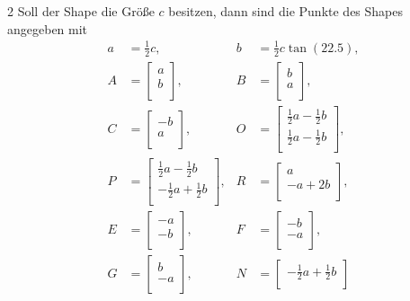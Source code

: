 \documentclass[twoside,fontsize=brochure]{tudcdreprt}
\begin{document}
\begin{multicols*}{2}
Soll der Shape die Größe $c$ besitzen, dann sind die Punkte des Shapes angegeben mit
\begin{align}
  a &= \frac{1}{2} c, & b &= \frac{1}{2} c \tan(\num{22.5}), \\
  A &= \begin{bmatrix}
    a \\
    b \\
  \end{bmatrix}, &
  B &= \begin{bmatrix}
    b \\
    a \\
  \end{bmatrix}, \\
  C &= \begin{bmatrix}
    -b \\
    a \\
  \end{bmatrix}, &
  O &= \begin{bmatrix}
    \frac{1}{2} a - \frac{1}{2}b \\
    \frac{1}{2} a - \frac{1}{2}b \\
  \end{bmatrix}, \\
  P &= \begin{bmatrix}
    \frac{1}{2} a - \frac{1}{2}b \\
    -\frac{1}{2} a + \frac{1}{2}b \\
  \end{bmatrix}, &
  R &= \begin{bmatrix}
    a \\
    -a + 2b \\
  \end{bmatrix}, \\
  E &= \begin{bmatrix}
    -a \\
    -b \\
  \end{bmatrix}, &
  F &= \begin{bmatrix}
    -b \\
    -a \\
  \end{bmatrix}, \\
  G &= \begin{bmatrix}
    b \\
    -a \\
  \end{bmatrix}, &
  N &= \begin{bmatrix}
    -\frac{1}{2} a + \frac{1}{2}b \\

\end{bmatrix}
\end{align}
\end{multicols*}
\end{document}
